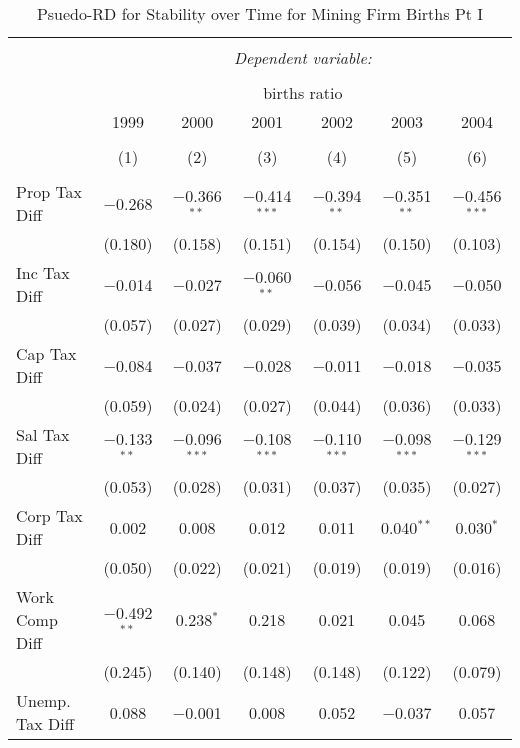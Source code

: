 
\begin{table}[!htbp] \centering 
  \caption{Psuedo-RD for Stability over Time for  Mining Firm Births Pt I} 
  \label{21year} 
\small 
\begin{tabular}{@{\extracolsep{5pt}}lcccccc} 
\\[-1.8ex]\hline 
\hline \\[-1.8ex] 
 & \multicolumn{6}{c}{\textit{Dependent variable:}} \\ 
\cline{2-7} 
\\[-1.8ex] & \multicolumn{6}{c}{births ratio} \\ 
 & 1999 & 2000 & 2001 & 2002 & 2003 & 2004 \\ 
\\[-1.8ex] & (1) & (2) & (3) & (4) & (5) & (6)\\ 
\hline \\[-1.8ex] 
 Prop Tax Diff & $-$0.268 & $-$0.366$^{**}$ & $-$0.414$^{***}$ & $-$0.394$^{**}$ & $-$0.351$^{**}$ & $-$0.456$^{***}$ \\ 
  & (0.180) & (0.158) & (0.151) & (0.154) & (0.150) & (0.103) \\ 
  Inc Tax Diff & $-$0.014 & $-$0.027 & $-$0.060$^{**}$ & $-$0.056 & $-$0.045 & $-$0.050 \\ 
  & (0.057) & (0.027) & (0.029) & (0.039) & (0.034) & (0.033) \\ 
  Cap Tax Diff & $-$0.084 & $-$0.037 & $-$0.028 & $-$0.011 & $-$0.018 & $-$0.035 \\ 
  & (0.059) & (0.024) & (0.027) & (0.044) & (0.036) & (0.033) \\ 
  Sal Tax Diff & $-$0.133$^{**}$ & $-$0.096$^{***}$ & $-$0.108$^{***}$ & $-$0.110$^{***}$ & $-$0.098$^{***}$ & $-$0.129$^{***}$ \\ 
  & (0.053) & (0.028) & (0.031) & (0.037) & (0.035) & (0.027) \\ 
  Corp Tax Diff & 0.002 & 0.008 & 0.012 & 0.011 & 0.040$^{**}$ & 0.030$^{*}$ \\ 
  & (0.050) & (0.022) & (0.021) & (0.019) & (0.019) & (0.016) \\ 
  Work Comp Diff & $-$0.492$^{**}$ & 0.238$^{*}$ & 0.218 & 0.021 & 0.045 & 0.068 \\ 
  & (0.245) & (0.140) & (0.148) & (0.148) & (0.122) & (0.079) \\ 
  Unemp. Tax Diff & 0.088 & $-$0.001 & 0.008 & 0.052 & $-$0.037 & 0.057 \\ 

\end{tabular}
\end{table}
